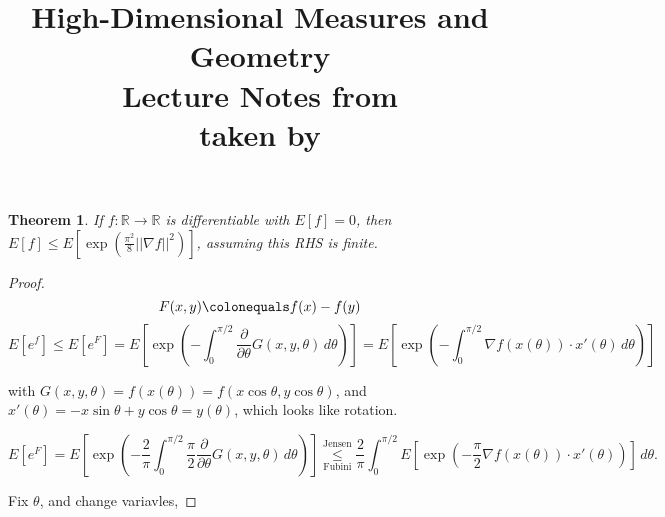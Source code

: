 \documentclass[12pt]{article}
\date{} %
\author{} %
\title{{\bf High-Dimensional Measures and Geometry}\\
Lecture Notes from \lecdat\\[0.1cm] \small taken by \notesby}
\newtheorem{thm}{Theorem}[section]
\theoremstyle{remark}
\newcommand{\reals}[0] { \mathbb{R}}
\newcommand{\rarw}[0] { \rightarrow }
\newcommand{ \defeq }[0] { \colonequals }
\newcommand{ \Ex }[1] { E\left[ #1 \right ] }
\begin{document}
\maketitle


\begin{thm} 

If $f: \reals \rarw \reals$ is differentiable with $\Ex{f} = 0$, then $\Ex{f} \le \Ex{\exp(\frac{\pi^2}{8} || \nabla f || ^2)}$, assuming this RHS is finite. 

\end{thm}


\begin{proof} 

$$
    F(x,y) \defeq f(x) - f(y)
$$
$$
    \Ex{e^f} \le \Ex{e^F} = \Ex{\exp\left( - \int_0^{\pi/2} \frac{\partial}{\partial \theta} G(x,y,\theta) \, d\theta    \right)} =
     \Ex{\exp\left( - \int_0^{\pi/2}    \nabla f(x(\theta)) \cdot x'(\theta)      \, d\theta    \right)}
$$

\noindent
with $G(x,y,\theta) = f(x(\theta)) = f(x \cos \theta, y \cos \theta )$, and $x'(\theta) = -x \sin \theta + y \cos \theta = y(\theta)$, which looks like rotation.

$$
\Ex{e^F} = \Ex{ \exp \left( -\frac{2}{\pi} \int_0^{\pi/2} \frac{\pi}{2} \frac{\partial}{\partial \theta} G(x,y, \theta) \, d\theta \right) } \overset{\textrm{Jensen}}{ \underset{\textrm{Fubini}}{\le} }
\frac{2}{\pi}  \int_0^{\pi/2} \Ex{ \exp \left( - \frac{\pi}{2} \nabla f(x(\theta)) \cdot x'(\theta)   \right) } \, d\theta.
$$


Fix $\theta$, and change variavles, 



\end{proof}
\end{document}

